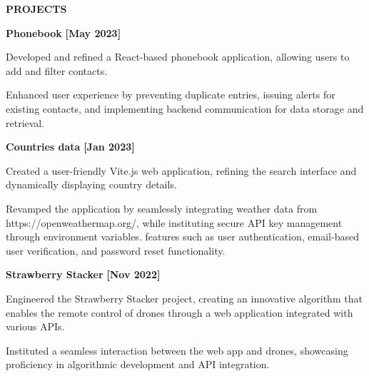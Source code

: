 \documentclass[a4paper,10pt]{article}
\begin{document}
\colorbox{titleColor}{\parbox{6.7in}{\textbf{ PROJECTS}}}


\begin{itemize*}
  \setlength{\itemsep}{1pt}
  \item \textbf{\small{Phonebook}} \hfill {\small{{\textbf{[May 2023]}}}\/}
  \begin{itemize*}
    \item Developed and refined a React-based phonebook application, allowing users to add and filter contacts.
    \item Enhanced user experience by preventing duplicate entries, issuing alerts for existing contacts, and implementing backend communication for data storage and retrieval.
  \end{itemize*}
\end{itemize*}

\begin{itemize*}
  \setlength{\itemsep}{1pt}
  \item \textbf{\small{Countries data}} \hfill {\small{{\textbf{[Jan 2023]}}}\/}
  \begin{itemize*}
    \item Created a user-friendly Vite.js web application, refining the search interface and dynamically displaying country details.
  \end{itemize*}
  \begin{itemize*}
    \item Revamped the application by seamlessly integrating weather data from https://openweathermap.org/, while instituting secure API key management through environment variables.
    features such as user authentication, email-based user verification, and password reset functionality.
  \end{itemize*}
\end{itemize*}

\begin{itemize*}
  \setlength{\itemsep}{1pt}
  \item \textbf{\small{Strawberry Stacker}} \hfill {\small{{\textbf{[Nov 2022]}}}\/}
  \begin{itemize*}
    \item     Engineered the Strawberry Stacker project, creating an innovative algorithm that enables the remote control of drones through a web application integrated with various APIs.
    \item Instituted a seamless interaction between the web app and drones, showcasing proficiency in algorithmic development and API integration.
  \end{itemize*}
\end{itemize*}
\end{document}
